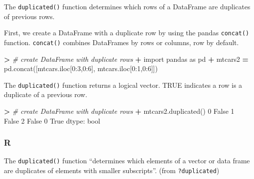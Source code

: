 \documentclass[
]{book}
\newenvironment{Shaded}{\begin{snugshade}}{\end{snugshade}}
\newcommand{\BuiltInTok}[1]{#1}
\newcommand{\CommentTok}[1]{\textcolor[rgb]{0.56,0.35,0.01}{\textit{#1}}}
\newcommand{\DecValTok}[1]{\textcolor[rgb]{0.00,0.00,0.81}{#1}}
\newcommand{\ImportTok}[1]{#1}
\newcommand{\NormalTok}[1]{#1}
\newcommand{\OperatorTok}[1]{\textcolor[rgb]{0.81,0.36,0.00}{\textbf{#1}}}
\newcommand{\VariableTok}[1]{\textcolor[rgb]{0.00,0.00,0.00}{#1}}
\begin{document}
The \texttt{duplicated()} function determines which rows of a DataFrame are duplicates of previous rows.

First, we create a DataFrame with a duplicate row by using the pandas \texttt{concat()} function. \texttt{concat()} combines DataFrames by rows or columns, row by default.

\begin{Shaded}
\begin{Highlighting}[]
\OperatorTok{\textgreater{}} \CommentTok{\# create DataFrame with duplicate rows}
\OperatorTok{+} \ImportTok{import}\NormalTok{ pandas }\ImportTok{as}\NormalTok{ pd}
\OperatorTok{+}\NormalTok{ mtcars2 }\OperatorTok{=}\NormalTok{ pd.concat([mtcars.iloc[}\DecValTok{0}\NormalTok{:}\DecValTok{3}\NormalTok{,}\DecValTok{0}\NormalTok{:}\DecValTok{6}\NormalTok{], mtcars.iloc[}\DecValTok{0}\NormalTok{:}\DecValTok{1}\NormalTok{,}\DecValTok{0}\NormalTok{:}\DecValTok{6}\NormalTok{]])}
\end{Highlighting}
\end{Shaded}

The \texttt{duplicated()} function returns a logical vector. TRUE indicates a row is a duplicate of a previous row.

\begin{Shaded}
\begin{Highlighting}[]
\OperatorTok{\textgreater{}} \CommentTok{\# create DataFrame with duplicate rows}
\OperatorTok{+}\NormalTok{ mtcars2.duplicated()}
\DecValTok{0}    \VariableTok{False}
\DecValTok{1}    \VariableTok{False}
\DecValTok{2}    \VariableTok{False}
\DecValTok{0}     \VariableTok{True}
\NormalTok{dtype: }\BuiltInTok{bool}
\end{Highlighting}
\end{Shaded}

\hypertarget{r-27}{%
\subsubsection*{R}\label{r-27}}

The \texttt{duplicated()} function ``determines which elements of a vector or data frame are duplicates of elements with smaller subscripts''. (from \texttt{?duplicated})
\end{document}
